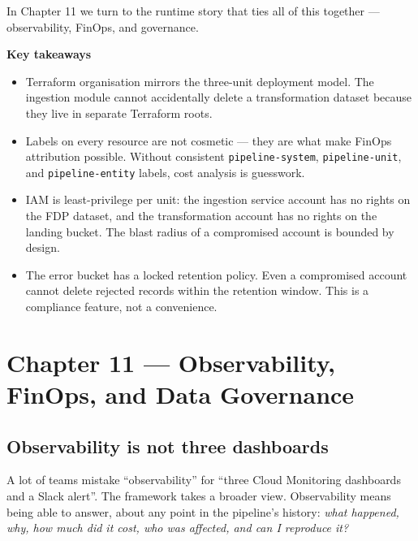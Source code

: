 \documentclass[
  11pt,
  british,
  oneside]{book}
\begin{document}
In Chapter 11 we turn to the runtime story that ties all of this
together --- observability, FinOps, and governance.

\begin{takeaways}
\textbf{Key takeaways}
\begin{itemize}
  \item Terraform organisation mirrors the three-unit deployment model. The ingestion module cannot accidentally delete a transformation dataset because they live in separate Terraform roots.
  \item Labels on every resource are not cosmetic — they are what make FinOps attribution possible. Without consistent \texttt{pipeline-system}, \texttt{pipeline-unit}, and \texttt{pipeline-entity} labels, cost analysis is guesswork.
  \item IAM is least-privilege per unit: the ingestion service account has no rights on the FDP dataset, and the transformation account has no rights on the landing bucket. The blast radius of a compromised account is bounded by design.
  \item The error bucket has a locked retention policy. Even a compromised account cannot delete rejected records within the retention window. This is a compliance feature, not a convenience.
\end{itemize}
\end{takeaways}

\newpage

\hypertarget{chapter-11-observability-finops-and-data-governance}{%
\chapter{Chapter 11 --- Observability, FinOps, and Data
Governance}\label{chapter-11-observability-finops-and-data-governance}}

\hypertarget{observability-is-not-three-dashboards}{%
\section{Observability is not three
dashboards}\label{observability-is-not-three-dashboards}}

A lot of teams mistake ``observability'' for ``three Cloud Monitoring
dashboards and a Slack alert''. The framework takes a broader view.
Observability means being able to answer, about any point in the
pipeline's history: \emph{what happened, why, how much did it cost, who
was affected, and can I reproduce it?}
\end{document}
